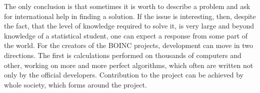 \documentclass[10pt, a5paper]{article}
\begin{document}
The only conclusion is that sometimes it is worth to describe a problem and ask for international help in finding a solution. If the issue is interesting, then, despite the fact, that the level of knowledge required to solve it, is very large and beyond knowledge of a statistical student, one can expect a response from some part of the world. For the creators of the BOINC projects, development can move in two directions. The first is calculations performed on thousands of computers and other, working on more and more perfect algorithms, which often are written not only by the official developers. Contribution to the project can be achieved by whole society, which forms around the project.
\end{document}
